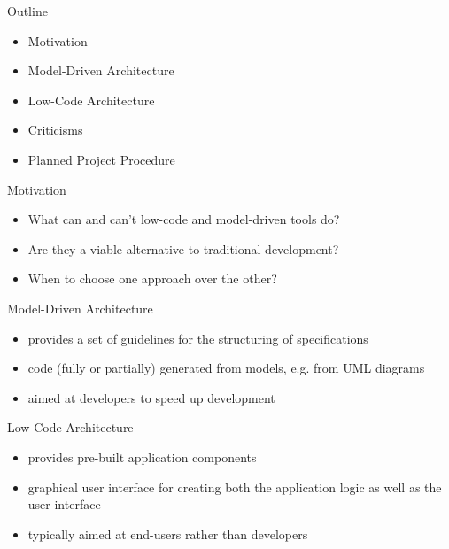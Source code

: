 \documentclass[aspectratio=169]{beamer}
\date{\formatdate{12}{01}{2021}}
\institute{supervised by Prof. Dr. Ruth Breu}
\begin{document}
  \maketitle

  \begin{frame}{Outline}
    \begin{itemize}
      \item Motivation
      \item Model-Driven Architecture
      \item Low-Code Architecture
      \item Criticisms
      \item Planned Project Procedure
    \end{itemize}
  \end{frame}

  \begin{frame}{Motivation}
    \begin{itemize}
      \item What can and can't low-code and model-driven tools do?
      \item Are they a viable alternative to traditional development?
      \item When to choose one approach over the other?
    \end{itemize}
  \end{frame}

  \begin{frame}{Model-Driven Architecture}
    \begin{itemize}
      \item provides a set of guidelines for the structuring of specifications
      \item code (fully or partially) generated from models, e.g. from UML diagrams
      \item aimed at developers to speed up development
    \end{itemize}
  \end{frame}

  \begin{frame}{Low-Code Architecture}
    \begin{itemize}
      \item provides pre-built application components
      \item graphical user interface for creating both the
            application logic as well as the user interface
      \item typically aimed at end-users rather than developers
    \end{itemize}
  \end{frame}
\end{document}
